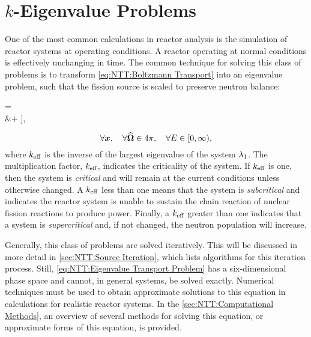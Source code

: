 {{    }
    \section{\texorpdfstring{$k$}{k}-Eigenvalue Problems}{\label{sec:NTT:k-Eigenvalue Problems}
        One of the most common calculations in reactor analysis is the simulation of reactor systems at operating conditions.
        A reactor operating at normal conditions is effectively unchanging in time.
        The common technique for solving this class of problems is to transform \cref{eq:NTT:Boltzmann Transport} into an eigenvalue problem, such that the fission source is scaled to preserve neutron balance:
        \begin{aequation}\label{eq:NTT:Eigenvalue Transport Problem}
                \Big[\dir\vdot\grad &+ \xst\Big]\aflux
                    =
                    \rfourpi\Bigg[
                        \source\\
                        &+ \intl[0][\infty]\intl[\fourpi]\xss\aflux[\loc][\dirprime][\Eprime]\ddirprime\dif{\Eprime}\\\qquad\qquad
                        &+ \frac{\spect}{\keff}\intl[0][\infty]\nufis\sflux[\loc][\Eprime]\dif{\Eprime}
                    \Bigg],
        \end{aequation}
        \begin{equation*}
            \forall\boldsymbol{x}, \quad \forall\boldsymbol{\widehat{\Omega}}\in4\pi,\quad \forall E\in[0,\infty),
        \end{equation*}
        where $k_{\text{eff}}$ is the inverse of the largest eigenvalue of the system $\lambda_1$.
        The multiplication factor, $k_{\text{eff}}$, indicates the criticality of the system.
        If $k_{\text{eff}}$ is one, then the system is \emph{critical} and will remain at the current conditions unless otherwise changed.
        A $k_{\text{eff}}$ less than one means that the system is \emph{subcritical} and indicates the reactor system is unable to sustain the chain reaction of nuclear fission reactions to produce power.
        Finally, a $k_{\text{eff}}$ greater than one indicates that a system is \emph{supercritical} and, if not changed, the neutron population will increase.

        Generally, this class of problems are solved iteratively.
        This will be discussed in more detail in \cref{sec:NTT:Source Iteration}, which lists algorithms for this iteration process.
        Still, \cref{eq:NTT:Eigenvalue Transport Problem} has a six-dimensional phase space and cannot, in general systems, be solved exactly.
        Numerical techniques must be used to obtain approximate solutions to this equation in calculations for realistic reactor systems.
        In the \cref{sec:NTT:Computational Methods}, an overview of several methods for solving this equation, or approximate forms of this equation, is provided.
    }
}
